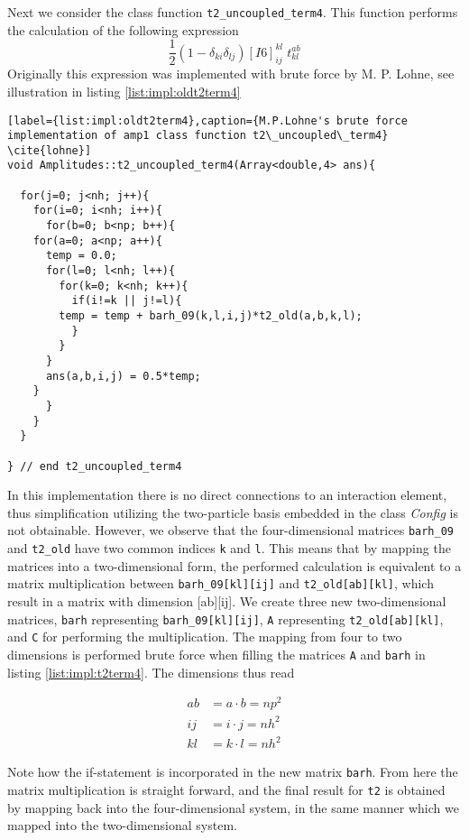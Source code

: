Next we consider the class function \texttt{t2\_uncoupled\_term4}. This function performs the calculation of the following expression
\begin{equation*}
\frac{1}{2}(1-\delta_{ki}\delta_{lj})[I6]_{ij}^{kl}\phantom{.}t_{kl}^{ab}
\label{eq:impl:t2term4expression}
\end{equation*}
Originally this expression was implemented with brute force by M. P. Lohne, see illustration in listing \ref{list:impl:oldt2term4}
\begin{lstlisting}[label={list:impl:oldt2term4},caption={M.P.Lohne's brute force implementation of amp1 class function t2\_uncoupled\_term4} \cite{lohne}]
void Amplitudes::t2_uncoupled_term4(Array<double,4> ans){

  for(j=0; j<nh; j++){
    for(i=0; i<nh; i++){
      for(b=0; b<np; b++){
	for(a=0; a<np; a++){
	  temp = 0.0;
	  for(l=0; l<nh; l++){
	    for(k=0; k<nh; k++){
	      if(i!=k || j!=l){
		temp = temp + barh_09(k,l,i,j)*t2_old(a,b,k,l);
	      }
	    }
	  }
	  ans(a,b,i,j) = 0.5*temp;
	}
      }
    }
  }
  
} // end t2_uncoupled_term4
\end{lstlisting}
In this implementation there is no direct connections to an interaction element, thus simplification utilizing the two-particle basis embedded in the class \emph{Config} is not obtainable. However, we observe that the four-dimensional matrices \texttt{barh\_09} and \texttt{t2\_old} have two common indices \texttt{k} and \texttt{l}. This means that by mapping the matrices into a two-dimensional form, the performed calculation is equivalent to a matrix multiplication between \texttt{barh\_09[kl][ij]} and \texttt{t2\_old[ab][kl]}, which result in a matrix with dimension [ab][ij]. We create three new two-dimensional matrices, \texttt{barh} representing \texttt{barh\_09[kl][ij]}, \texttt{A} representing \texttt{t2\_old[ab][kl]}, and \texttt{C} for performing the multiplication. The mapping from four to two dimensions is performed brute force when filling the matrices \texttt{A} and \texttt{barh} in listing \ref{list:impl:t2term4}. The dimensions thus read

\begin{align*}
ab &= a \cdot b=np^2 \\
ij &= i \cdot j=nh^2 \\
kl &= k \cdot l=nh^2
\label{eq:impl:t2term4dimensions}
\end{align*}

Note how the if-statement is incorporated in the new matrix \texttt{barh}. From here the matrix multiplication is straight forward, and the final result for \texttt{t2} is obtained by mapping back into the four-dimensional system, in the same manner which we mapped into the two-dimensional system.

